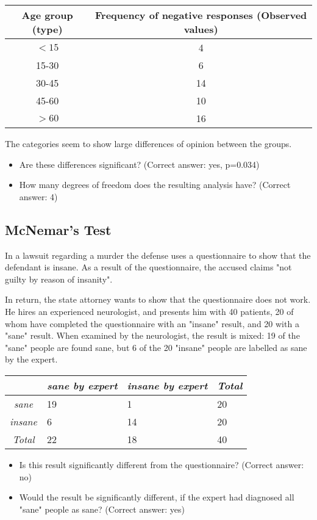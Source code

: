 \begin{table}[h]
    \centering
    \begin{tabular}{c|c}
      Age group (type) &	Frequency of negative responses (Observed values)\\
      \hline
      $<15$ & 4 \\
      15-30 & 6 \\
      30-45 & 14 \\
      45-60 & 10 \\
      $>60$ & 16
    \end{tabular}
\end{table}

The categories seem to show large differences of opinion between the groups.

\begin{itemize}
  \item     Are these differences significant?
    (Correct answer: yes, p=0.034)

  \item     How many degrees of freedom does the resulting analysis have?
    (Correct answer: 4)

\end{itemize}

\subsection*{McNemar's Test}

In a lawsuit regarding a murder the defense uses a questionnaire to show that the defendant is insane. As a result of the questionnaire, the accused claims "not guilty by reason of insanity".

In return, the state attorney wants to show that the questionnaire does not work. He hires an experienced neurologist, and presents him with 40 patients, 20 of whom have completed the questionnaire with an "insane" result, and 20 with a "sane" result. When examined by the neurologist, the result is mixed: 19 of the "sane" people are found sane, but 6 of the 20 "insane" people are labelled as sane by the expert.

\begin{table}[h]
  \centering
  \begin{tabular}{|c|l l | l|}
  \hline
  & \emph{sane by expert} & \emph{insane by expert} & \emph{Total} \\
  \hline
  \emph{sane} & 19 & 1 & 20 \\
  \emph{insane} & 6 & 14 & 20 \\
  \hline
  \emph{Total} & 22 & 18 & 40 \\
  \hline
  \end{tabular}
\end{table}


\begin{itemize}
  \item     Is this result significantly different from the questionnaire?
    (Correct answer: no)

  \item     Would the result be significantly different, if the expert had diagnosed all "sane" people as sane?
    (Correct answer: yes)
\end{itemize}
